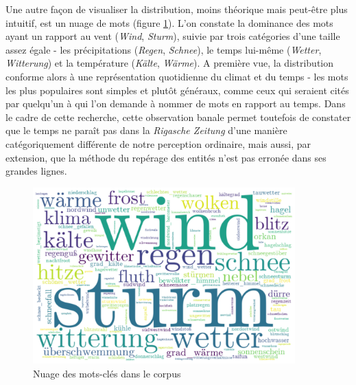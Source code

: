 \documentclass[a4paper,twoside,12pt]{article}
\begin{document}
Une autre façon de visualiser la distribution, moins théorique mais peut-être plus intuitif, est un nuage de mots (figure \ref{fig:wordcloud}). L'on constate la dominance des mots ayant un rapport au vent (\textit{Wind}, \textit{Sturm}), suivie par trois catégories d'une taille assez égale - les précipitations (\textit{Regen}, \textit{Schnee}), le \og temps \fg{} lui-même (\textit{Wetter}, \textit{Witterung}) et la température (\textit{Kälte}, \textit{Wärme}). A première vue, la distribution conforme alors à une représentation quotidienne du climat et du temps - les mots les plus populaires sont simples et plutôt généraux, comme ceux qui seraient cités par quelqu'un à qui l'on demande à nommer de mots en rapport au temps. Dans le cadre de cette recherche, cette observation banale permet toutefois de constater que le temps ne paraît pas dans la \textit{Rigasche Zeitung} d'une manière catégoriquement différente de notre perception ordinaire, mais aussi, par extension, que la méthode du repérage des entités n'est pas erronée dans ses grandes lignes. %

\begin{figure}[h]
    \centering
    \includegraphics[width=0.9\textwidth]{images/wordcloud_general.pdf}
    \caption{Nuage des mots-clés dans le corpus}
    \label{fig:wordcloud}
\end{figure}
\end{document}
